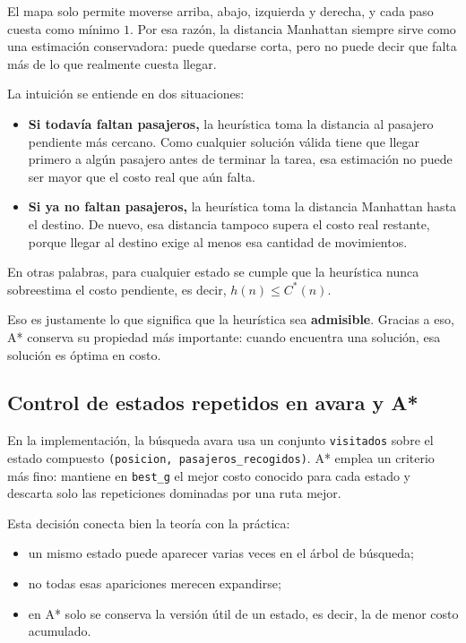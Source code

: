 \documentclass[12pt,a4paper]{article}
\begin{document}
El mapa solo permite moverse arriba, abajo, izquierda y derecha, y cada paso cuesta como mínimo \(1\). Por esa razón, la distancia Manhattan siempre sirve como una estimación conservadora: puede quedarse corta, pero no puede decir que falta más de lo que realmente cuesta llegar.

La intuición se entiende en dos situaciones:
\begin{itemize}
    \item \textbf{Si todavía faltan pasajeros,} la heurística toma la distancia al pasajero pendiente más cercano. Como cualquier solución válida tiene que llegar primero a algún pasajero antes de terminar la tarea, esa estimación no puede ser mayor que el costo real que aún falta.
    \item \textbf{Si ya no faltan pasajeros,} la heurística toma la distancia Manhattan hasta el destino. De nuevo, esa distancia tampoco supera el costo real restante, porque llegar al destino exige al menos esa cantidad de movimientos.
\end{itemize}

En otras palabras, para cualquier estado se cumple que la heurística nunca sobreestima el costo pendiente, es decir, \(h(n) \leq C^*(n)\).

Eso es justamente lo que significa que la heurística sea \textbf{admisible}. Gracias a eso, A* conserva su propiedad más importante: cuando encuentra una solución, esa solución es óptima en costo.

\subsection{Control de estados repetidos en avara y A*}
En la implementación, la búsqueda avara usa un conjunto \texttt{visitados} sobre el estado compuesto \texttt{(posicion, pasajeros\_recogidos)}. A* emplea un criterio más fino: mantiene en \texttt{best\_g} el mejor costo conocido para cada estado y descarta solo las repeticiones dominadas por una ruta mejor.

Esta decisión conecta bien la teoría con la práctica:
\begin{itemize}
    \item un mismo estado puede aparecer varias veces en el árbol de búsqueda;
    \item no todas esas apariciones merecen expandirse;
    \item en A* solo se conserva la versión útil de un estado, es decir, la de menor costo acumulado.
\end{itemize}
\end{document}
